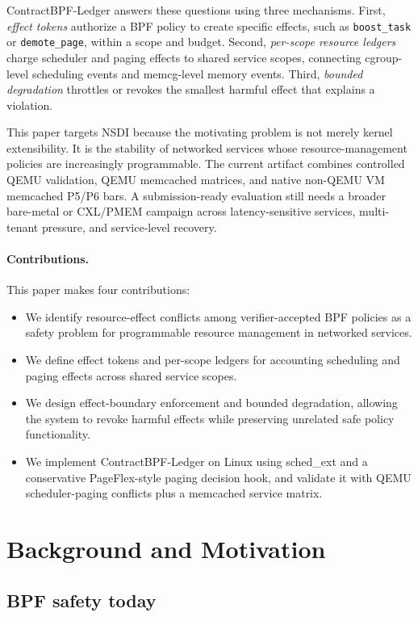 \documentclass[letterpaper,twocolumn,10pt]{article}
\newcommand{\sys}{ContractBPF-Ledger\xspace}
\begin{document}
\sys answers these questions using three mechanisms. First, \emph{effect tokens} authorize a BPF policy to create specific effects, such as \texttt{boost\_task} or \texttt{demote\_page}, within a scope and budget. Second, \emph{per-scope resource ledgers} charge scheduler and paging effects to shared service scopes, connecting cgroup-level scheduling events and memcg-level memory events. Third, \emph{bounded degradation} throttles or revokes the smallest harmful effect that explains a violation.

This paper targets NSDI because the motivating problem is not merely kernel extensibility. It is the stability of networked services whose resource-management policies are increasingly programmable. The current artifact combines controlled QEMU validation, QEMU memcached matrices, and native non-QEMU VM memcached P5/P6 bars. A submission-ready evaluation still needs a broader bare-metal or CXL/PMEM campaign across latency-sensitive services, multi-tenant pressure, and service-level recovery.

\paragraph{Contributions.}
This paper makes four contributions:
\begin{itemize}[leftmargin=*]
    \item We identify resource-effect conflicts among verifier-accepted BPF policies as a safety problem for programmable resource management in networked services.
    \item We define effect tokens and per-scope ledgers for accounting scheduling and paging effects across shared service scopes.
    \item We design effect-boundary enforcement and bounded degradation, allowing the system to revoke harmful effects while preserving unrelated safe policy functionality.
    \item We implement \sys on Linux using sched\_ext and a conservative PageFlex-style paging decision hook, and validate it with QEMU scheduler-paging conflicts plus a memcached service matrix.
\end{itemize}

\section{Background and Motivation}

\subsection{BPF safety today}
\end{document}
